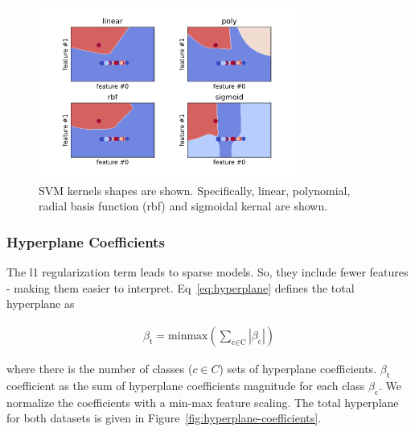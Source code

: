 \documentclass[runningheads]{llncs}
\begin{document}
\begin{figure}[htb]
  \centering
  \includegraphics[width=8.5cm]{kernels.png}
  \caption{
    SVM kernels shapes are shown.
    Specifically, linear, polynomial, radial basis function (rbf) and sigmoidal kernal are shown.}
  \label{fig:kernels}
\end{figure}

\subsubsection{Hyperplane Coefficients}
\label{sec:background-svm-hyperplane}

The l1 regularization term leads to sparse models.
So, they include fewer features - making them easier to interpret.
Eq~\ref{eq:hyperplane} defines the total hyperplane as

\begin{align}\label{eq:hyperplane}
  \beta_{\text{t}} = \text{minmax}(
  \sum_{\text{c} \in \text{C}}
  |\beta_{\text{c}}|
  )
\end{align}

where there is the number of classes ($c \in C$) sets of hyperplane coefficients.
$\beta_{\text{t}}$ coefficient as the sum of hyperplane coefficients magnitude for each class $\beta_{\text{c}}$.
We normalize the coefficients with a min-max feature scaling.
The total hyperplane for both datasets is given in Figure~\ref{fig:hyperplane-coefficients}.
\end{document}
